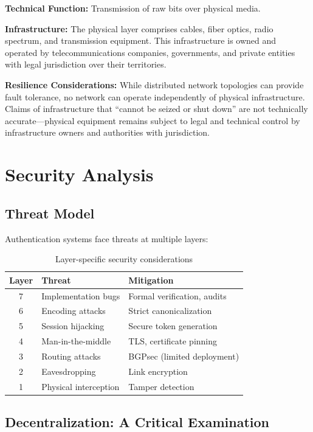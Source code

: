 \documentclass[11pt,a4paper]{article}
\begin{document}
\textbf{Technical Function:} Transmission of raw bits over physical media.

\textbf{Infrastructure:}
The physical layer comprises cables, fiber optics, radio spectrum, and transmission equipment. This infrastructure is owned and operated by telecommunications companies, governments, and private entities with legal jurisdiction over their territories.

\textbf{Resilience Considerations:}
While distributed network topologies can provide fault tolerance, no network can operate independently of physical infrastructure. Claims of infrastructure that ``cannot be seized or shut down'' are not technically accurate---physical equipment remains subject to legal and technical control by infrastructure owners and authorities with jurisdiction.

\section{Security Analysis}

\subsection{Threat Model}

Authentication systems face threats at multiple layers:

\begin{table}[h]
\centering
\caption{Layer-specific security considerations}
\begin{tabular}{@{}cll@{}}
\toprule
\textbf{Layer} & \textbf{Threat} & \textbf{Mitigation} \\
\midrule
7 & Implementation bugs & Formal verification, audits \\
6 & Encoding attacks & Strict canonicalization \\
5 & Session hijacking & Secure token generation \\
4 & Man-in-the-middle & TLS, certificate pinning \\
3 & Routing attacks & BGPsec (limited deployment) \\
2 & Eavesdropping & Link encryption \\
1 & Physical interception & Tamper detection \\
\bottomrule
\end{tabular}
\end{table}

\subsection{Decentralization: A Critical Examination}
\end{document}

